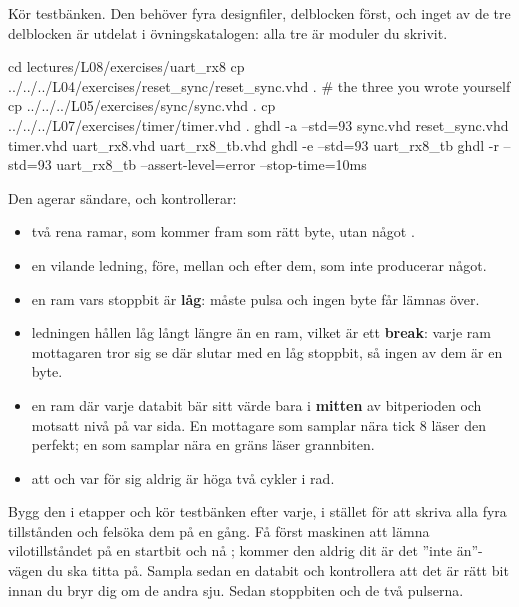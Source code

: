  Kör testbänken. Den behöver fyra designfiler, delblocken först, och inget av de tre
delblocken är utdelat i övningskatalogen: alla tre är moduler du skrivit.

\begin{shell}
cd lectures/L08/exercises/uart_rx8
cp ../../../L04/exercises/reset_sync/reset_sync.vhd .     # the three you wrote yourself
cp ../../../L05/exercises/sync/sync.vhd .
cp ../../../L07/exercises/timer/timer.vhd .
ghdl -a --std=93 sync.vhd reset_sync.vhd timer.vhd uart_rx8.vhd uart_rx8_tb.vhd
ghdl -e --std=93 uart_rx8_tb
ghdl -r --std=93 uart_rx8_tb --assert-level=error --stop-time=10ms
\end{shell}

Den agerar sändare, och kontrollerar:
\begin{itemize}
  \item två rena ramar, som kommer fram som rätt byte, utan något .
  \item en vilande ledning, före, mellan och efter dem, som inte producerar något.
  \item en ram vars stoppbit är \textbf{låg}:  måste pulsa och ingen byte får lämnas
    över.
  \item ledningen hållen låg långt längre än en ram, vilket är ett \textbf{break}: varje ram
    mottagaren tror sig se där slutar med en låg stoppbit, så ingen av dem är en byte.
  \item en ram där varje databit bär sitt värde bara i \textbf{mitten} av bitperioden och motsatt
    nivå på var sida. En mottagare som samplar nära tick 8 läser den perfekt; en som samplar nära en
    gräns läser grannbiten.
  \item att  och  var för sig aldrig är höga två cykler i rad.
\end{itemize}

\note[Tips]Bygg den i etapper och kör testbänken efter varje, i stället för att skriva alla fyra
tillstånden och felsöka dem på en gång. Få först maskinen att lämna vilotillståndet på en startbit
och nå ; kommer den aldrig dit är det ”inte än”-vägen du ska titta på. Sampla sedan
en databit och kontrollera att det är rätt bit innan du bryr dig om de andra sju. Sedan stoppbiten
och de två pulserna.

